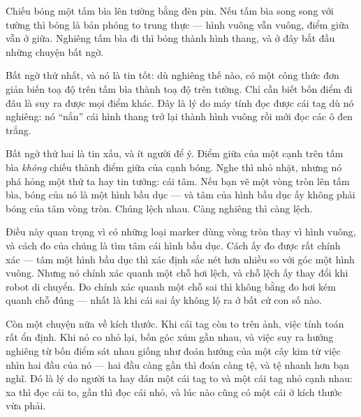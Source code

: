 \documentclass[../../marker.tex]{subfiles}
\begin{document}
\begin{dongian}
Chiếu bóng một tấm bìa lên tường bằng đèn pin. Nếu tấm bìa song song với tường thì bóng là bản phóng to trung thực --- hình vuông vẫn vuông, điểm giữa vẫn ở giữa. Nghiêng tấm bìa đi thì bóng thành hình thang, và ở đây bắt đầu những chuyện bất ngờ.

Bất ngờ thứ nhất, và nó là tin tốt: dù nghiêng thế nào, có một công thức đơn giản biến toạ độ trên tấm bìa thành toạ độ trên tường. Chỉ cần biết bốn điểm đi đâu là suy ra được mọi điểm khác. Đây là lý do máy tính đọc được cái tag dù nó nghiêng: nó ``nắn'' cái hình thang trở lại thành hình vuông rồi mới đọc các ô đen trắng.

Bất ngờ thứ hai là tin xấu, và ít người để ý. Điểm giữa của một cạnh trên tấm bìa \emph{không} chiếu thành điểm giữa của cạnh bóng. Nghe thì nhỏ nhặt, nhưng nó phá hỏng một thứ ta hay tin tưởng: cái tâm. Nếu bạn vẽ một vòng tròn lên tấm bìa, bóng của nó là một hình bầu dục --- và tâm của hình bầu dục ấy không phải bóng của tâm vòng tròn. Chúng lệch nhau. Càng nghiêng thì càng lệch.

Điều này quan trọng vì có những loại marker dùng vòng tròn thay vì hình vuông, và cách đo của chúng là tìm tâm cái hình bầu dục. Cách ấy đo được rất chính xác --- tâm một hình bầu dục thì xác định sắc nét hơn nhiều so với góc một hình vuông. Nhưng nó chính xác quanh một chỗ hơi lệch, và chỗ lệch ấy thay đổi khi robot di chuyển. Đo chính xác quanh một chỗ sai thì không bằng đo hơi kém quanh chỗ đúng --- nhất là khi cái sai ấy không lộ ra ở bất cứ con số nào.

Còn một chuyện nữa về kích thước. Khi cái tag còn to trên ảnh, việc tính toán rất ổn định. Khi nó co nhỏ lại, bốn góc xúm gần nhau, và việc suy ra hướng nghiêng từ bốn điểm sát nhau giống như đoán hướng của một cây kim từ việc nhìn hai đầu của nó --- hai đầu càng gần thì đoán càng tệ, và tệ nhanh hơn bạn nghĩ. Đó là lý do người ta hay dán một cái tag to và một cái tag nhỏ cạnh nhau: xa thì đọc cái to, gần thì đọc cái nhỏ, và lúc nào cũng có một cái ở kích thước vừa phải.

\end{dongian}
\end{document}
